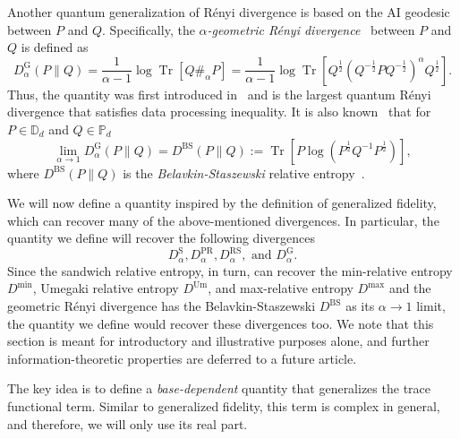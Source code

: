 \documentclass[12pt]{article}
\theoremstyle{definition}
\begin{document}
Another quantum generalization of R\'enyi divergence is based on the AI geodesic between $P$ and $Q$. Specifically, the \textit{$\alpha$-geometric R\'enyi divergence}~\cite{matsumoto2015new, fang2021geometric, katariya2021geometric} between $P$ and $Q$ is defined as
\begin{equation}
    D_\alpha^\text{G}(P \|Q) = \frac{1}{\alpha - 1} \log \operatorname{Tr}[Q \#_\alpha P] = \frac{1}{\alpha-1} \log \operatorname{Tr}\left[Q ^{\frac12} \left( Q ^{-\frac12} P Q ^{-\frac12} \right)^\alpha Q ^{\frac12} \right].
\end{equation}
Thus, the quantity was first introduced in~\cite{matsumoto2015new} and is the largest quantum R\'enyi divergence that satisfies data processing inequality. It is also known~\cite{matsumoto2015new, tomamichel2015quantum, katariya2021geometric} that for $P \in \mathbb D_d$ and $Q \in \mathbb P_d$
\begin{equation}
    \lim_{\alpha \to 1} D_\alpha^\text{G}(P\|Q) = D^\text{BS}(P \|Q) := \operatorname{Tr}\left[P \log \left( P ^{\frac12} Q ^{-1} P ^{\frac12} \right)\right],
\end{equation}
where $D^\text{BS}(P\|Q)$ is the \textit{Belavkin-Staszewski} relative entropy~\cite{belavkin1982c}.

We will now define a quantity inspired by the definition of generalized fidelity, which can recover many of the above-mentioned divergences. In particular, the quantity we define will recover the following divergences
\begin{equation}
    D^\text{S}_\alpha, D^\text{PR}_\alpha, D^\text{RS}_\alpha, \text{ and }D^\text{G}_\alpha. 
\end{equation}
Since the sandwich relative entropy, in turn, can recover the min-relative entropy $D^\text{min}$, Umegaki relative entropy $D^\text{Um}$, and max-relative entropy $D^\text{max}$ and the geometric R\'enyi divergence has the Belavkin-Staszewski $D^\text{BS}$ as its $\alpha \to 1$ limit, the quantity we define would recover these divergences too. We note that this section is meant for introductory and illustrative purposes alone, and further information-theoretic properties are deferred to a future article. 


The key idea is to define a \textit{base-dependent} quantity that generalizes the trace functional term. Similar to generalized fidelity, this term is complex in general, and therefore, we will only use its real part. 
\end{document}
